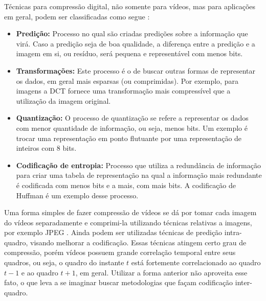 \documentclass[cic,tc]{iiufrgs}
\begin{document}
Técnicas para compressão digital, não somente para vídeos, mas para aplicações em geral,
podem ser classificadas como segue \cite{SullivanH264}:
\begin{itemize}
    \item \textbf{Predição:} Processo no qual são criadas predições sobre a informação 
    que virá. Caso a predição seja de boa qualidade, a diferença entre a predição e a 
    imagem em si, ou resíduo, será pequena e representável com menos bits.
    \item \textbf{Transformações:} Este processo é o de buscar outras formas de representar
    os dados, em geral mais esparsas (ou comprimidas). Por exemplo, para imagens a DCT 
    fornece uma transformação mais compressível que a utilização da imagem original.
    \item \textbf{Quantização:} O processo de quantização se refere a representar os dados
    com menor quantidade de informação, ou seja, menos bits. Um exemplo é trocar uma representação 
    em ponto flutuante por uma representação de inteiros com 8 bits.
    \item \textbf{Codificação de entropia:} Processo que utiliza a redundância de informação para 
    criar uma tabela de representação na qual a informação mais redundante é codificada
    com menos bits e a mais, com mais bits. A codificação de Huffman é um exemplo desse processo.
\end{itemize}

Uma forma simples de fazer compressão de vídeos se dá por tomar cada imagem do vídeos
separadamente e comprimi-la utilizando técnicas relativas a imagens, por exemplo JPEG \cite{SullivanH264}.
Ainda podem ser utilizadas técnicas de predição intra-quadro, visando melhorar a codificação.
Essas técnicas atingem certo grau de compressão, porém vídeos possuem grande correlação temporal
entre seus quadros, ou seja, o quadro do instante $t$ está fortemente correlacionado ao quadro $t-1$ e
ao quadro $t+1$, em geral.
Utilizar a forma anterior não aproveita esse fato, o que leva a se imaginar buscar metodologias
que façam codificação inter-quadro.
\end{document}
